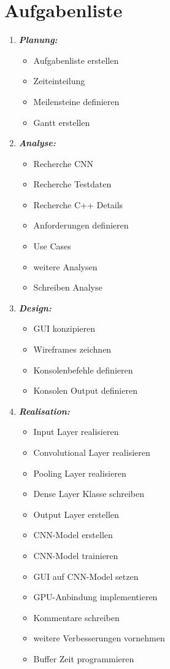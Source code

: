 \section{Aufgabenliste} 
\label{sec:PlanungAufgabenliste} 
\begin{enumerate} 
	\item \textbf{\emph{Planung:}} 
	\begin{itemize} 
		\item Aufgabenliste erstellen
		\item Zeiteinteilung 
		\item Meilensteine definieren 
		\item Gantt erstellen 
	\end{itemize} 

	\item \textbf{\emph{Analyse:}} 
	\begin{itemize} 
		\item Recherche CNN 
		\item Recherche Testdaten 
		\item Recherche C++ Details 
		\item Anforderungen definieren 
		\item Use Cases 
		\item weitere Analysen 
		\item Schreiben Analyse 
	\end{itemize} 

	\item \textbf{\emph{Design:}} 
	\begin{itemize} 
	\item GUI konzipieren 
	\item Wireframes zeichnen 
	\item Konsolenbefehle definieren 
	\item Konsolen Output definieren 
	\end{itemize}

	\item \textbf{\emph{Realisation:}} 
	\begin{itemize} 
		\item Input Layer realisieren 
		\item Convolutional Layer realisieren 
		\item Pooling Layer realisieren 
		\item Dense Layer Klasse schreiben 
		\item Output Layer erstellen 
		\item CNN-Model erstellen 
		\item CNN-Model trainieren 
		\item GUI auf CNN-Model setzen 
		\item GPU-Anbindung implementieren 
		\item Kommentare schreiben 
		\item weitere Verbesserungen vornehmen 
		\item Buffer Zeit programmieren 
	\end{itemize} 


\end{enumerate}
